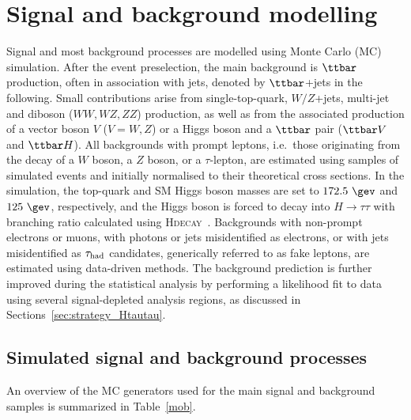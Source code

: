 \section{Signal and background modelling}
\label{sec:signal_background_model}

Signal and most background processes are modelled using Monte Carlo (MC) simulation.
After the event preselection, the main background is $\ttbar$ production, often in association with jets, denoted by $\ttbar$+jets in the following.
Small contributions arise from single-top-quark, $W/Z$+jets, multi-jet and diboson ($WW,WZ,ZZ$) production, as well as from the associated 
production of a vector boson $V$ ($V=W,Z$) or a Higgs boson and a $\ttbar$ pair ($\ttbar V$ and $\ttbar H$). All backgrounds 
with prompt leptons, i.e.\ those originating from the decay of a $W$ boson, a $Z$ boson, or a $\tau$-lepton,
are estimated using samples of simulated events and initially normalised to their theoretical cross sections.
In the simulation, the top-quark and SM Higgs boson masses are set to $172.5~\gev$ and $125~\gev$, respectively,
and the Higgs boson is forced to decay into $H\to \tau\tau$ with branching ratio calculated using \textsc{Hdecay}~\cite{Djouadi:1997yw}.  
Backgrounds with non-prompt electrons or muons, with photons or jets misidentified as electrons, or with jets misidentified as $\tau_{\mathrm{had}}$ candidates, 
generically referred to as fake leptons, are estimated using data-driven methods. 
The background prediction is further improved during the statistical analysis by performing a likelihood 
fit to data using several signal-depleted analysis regions, as discussed in Sections~\ref{sec:strategy_Htautau}.

\subsection{Simulated signal and background processes}
\label{sec:simulations}


An overview of the MC generators used for the main signal and background samples is summarized in Table~\ref{mob}.

